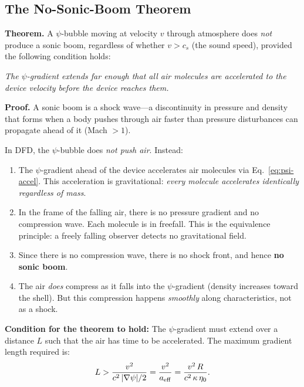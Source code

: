 \documentclass[11pt]{article}
\begin{document}
\subsection{The No-Sonic-Boom Theorem}

\begin{tcolorbox}[colback=green!5,colframe=green!50!black,title=
  Critical Prediction: No Sonic Boom]

\textbf{Theorem.} A $\psi$-bubble moving at velocity $v$ through
atmosphere does \emph{not} produce a sonic boom, regardless of whether
$v > c_s$ (the sound speed), provided the following condition holds:

\medskip
\textit{The $\psi$-gradient extends far enough that all air molecules
are accelerated to the device velocity before the device reaches them.}

\medskip
\textbf{Proof.} A sonic boom is a shock wave---a discontinuity in
pressure and density that forms when a body pushes through air faster
than pressure disturbances can propagate ahead of it (Mach $> 1$).

In DFD, the $\psi$-bubble does \emph{not push air}. Instead:

\begin{enumerate}
\item The $\psi$-gradient ahead of the device accelerates air molecules
  via Eq.~\eqref{eq:psi-accel}. This acceleration is gravitational:
  \emph{every molecule accelerates identically regardless of mass}.

\item In the frame of the falling air, there is no pressure gradient
  and no compression wave. Each molecule is in freefall. This is the
  equivalence principle: a freely falling observer detects no
  gravitational field.

\item Since there is no compression wave, there is no shock front, and
  hence \textbf{no sonic boom}.

\item The air \emph{does} compress as it falls into the $\psi$-gradient
  (density increases toward the shell). But this compression happens
  \emph{smoothly} along characteristics, not as a shock.
\end{enumerate}

\textbf{Condition for the theorem to hold:} The $\psi$-gradient must
extend over a distance $L$ such that the air has time to be accelerated.
The maximum gradient length required is:
\begin{equation}\label{eq:L-nosonic}
L > \frac{v^2}{c^2\,|\nabla\psi|/2}
  = \frac{v^2}{a_{\rm eff}}
  = \frac{v^2\,R}{c^2\,\kappa\,\eta_0}.
\end{equation}


\end{tcolorbox}
\end{document}
